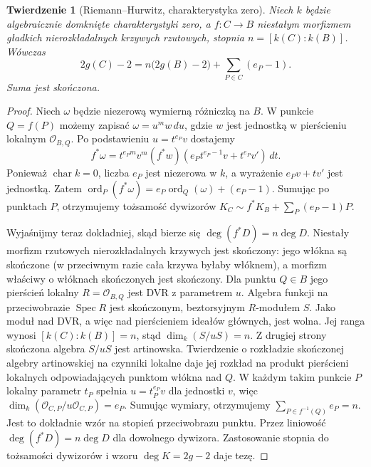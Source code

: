 \documentclass[11pt,a4paper,openany]{report}
\numberwithin{equation}{section}
\theoremstyle{plain}
\newtheorem{twierdzenie}{Twierdzenie}[section]
\theoremstyle{definition}
\theoremstyle{remark}
\newcommand{\Spec}{\operatorname{Spec}}
\begin{document}
\begin{twierdzenie}[Riemann--Hurwitz, charakterystyka zero]
\label{tw:RH}
Niech $k$ będzie algebraicznie domknięte
charakterystyki zero, a $f:C\to B$ niestałym
morfizmem gładkich nierozkładalnych krzywych
rzutowych, stopnia $n=[k(C):k(B)]$.
Wówczas
\[
 2g(C)-2=n\bigl(2g(B)-2\bigr)
  +\sum_{P\in C}(e_P-1).
\]
Suma jest skończona.
\end{twierdzenie}
\begin{proof}
Niech $\omega$ będzie niezerową wymierną
różniczką na $B$. W punkcie $Q=f(P)$ możemy
zapisać $\omega=u^m w\,du$, gdzie $w$
jest jednostką w pierścieniu lokalnym $\mathcal O_{B,Q}$.
Po podstawieniu $u=t^{e_P}v$ dostajemy
\[
 f^*\omega=t^{e_Pm}v^m(f^*w)
 (e_Pt^{e_P-1}v+t^{e_P}v')\,dt.
\]
Ponieważ $\operatorname{char}k=0$, liczba
$e_P$ jest niezerowa w $k$, a wyrażenie
$e_Pv+tv'$ jest jednostką. Zatem
$\operatorname{ord}_P(f^*\omega)=
 e_P\operatorname{ord}_Q(\omega)+(e_P-1)$.
Sumując po punktach $P$, otrzymujemy tożsamość
dywizorów
$K_C\sim f^*K_B+\sum_P(e_P-1)P$.

Wyjaśnijmy teraz dokładniej, skąd bierze się
$\deg(f^*D)=n\deg D$. Niestały morfizm
rzutowych nierozkładalnych krzywych jest skończony:
jego włókna są skończone (w przeciwnym razie
cała krzywa byłaby włóknem), a morfizm właściwy
o włóknach skończonych jest skończony.
Dla punktu $Q\in B$ jego pierścień lokalny
$R=\mathcal O_{B,Q}$ jest DVR z parametrem $u$.
Algebra funkcji na przeciwobrazie
$\Spec R$ jest skończonym, beztorsyjnym
$R$-modułem $S$. Jako moduł nad DVR,
a więc nad pierścieniem ideałów głównych, jest
wolna. Jej ranga wynosi
$[k(C):k(B)]=n$, stąd
$\dim_k(S/uS)=n$. Z drugiej strony skończona algebra $S/uS$ jest
artinowska. Twierdzenie o rozkładzie skończonej algebry
artinowskiej na czynniki lokalne daje jej rozkład
na produkt pierścieni lokalnych odpowiadających
punktom włókna nad $Q$. W każdym takim
punkcie $P$ lokalny parametr $t_P$ spełnia
$u=t_P^{e_P}v$ dla jednostki $v$, więc
$\dim_k(\mathcal O_{C,P}/u\mathcal O_{C,P})=e_P$.
Sumując wymiary, otrzymujemy
$\sum_{P\in f^{-1}(Q)}e_P=n$.
Jest to dokładnie wzór na stopień przeciwobrazu
punktu. Przez liniowość
$\deg(f^*D)=n\deg D$ dla dowolnego dywizora.
Zastosowanie stopnia do tożsamości dywizorów
i wzoru $\deg K=2g-2$ daje tezę.
\end{proof}
\end{document}
